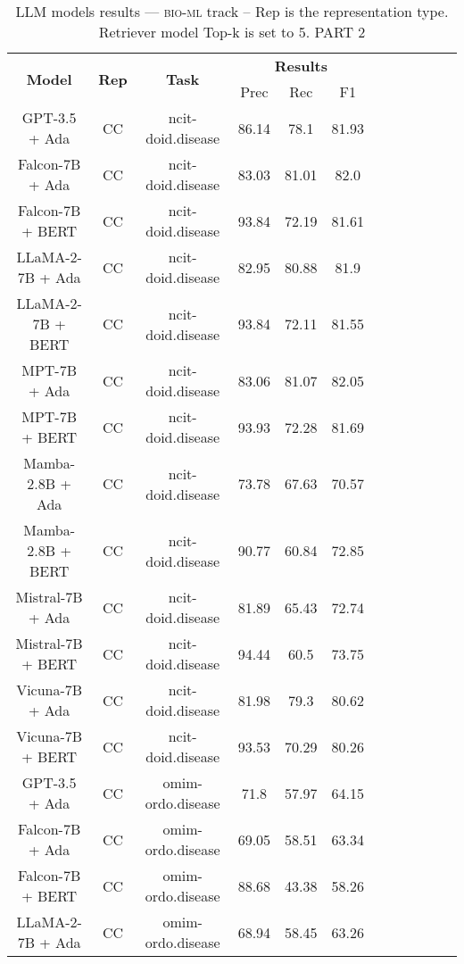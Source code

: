 \begin{table}
        \centering
        \small
        \caption{LLM models results --- \textsc{bio-ml} track -- Rep is the representation type. Retriever model Top-k is set to 5. PART 2 } \label{tab:llm_bio-ml2}
        \begin{tabular}{|c|c|c|c|c|c|c|c|c|c|c|c|}
            \hline
             \multirow{2}{*}{\textbf{Model}}  & \multirow{2}{*}{\textbf{Rep}}  & \multirow{2}{*}{\textbf{Task}} &  \multicolumn{3}{c|}{\textbf{Results}} \\
             \cline{4-6}
              & & & Prec & Rec & F1  \\
            \hline
	GPT-3.5 + Ada  & CC & ncit-doid.disease  &  86.14 &  78.1 & 81.93  \\
	Falcon-7B + Ada  & CC & ncit-doid.disease  &  83.03 &  81.01 & 82.0  \\
	Falcon-7B + BERT  & CC & ncit-doid.disease  &  93.84 &  72.19 & 81.61  \\
	LLaMA-2-7B + Ada  & CC & ncit-doid.disease  &  82.95 &  80.88 & 81.9  \\
	LLaMA-2-7B + BERT  & CC & ncit-doid.disease  &  93.84 &  72.11 & 81.55  \\
	MPT-7B + Ada  & CC & ncit-doid.disease  &  83.06 &  81.07 & 82.05  \\
	MPT-7B + BERT  & CC & ncit-doid.disease  &  93.93 &  72.28 & 81.69  \\
	Mamba-2.8B + Ada  & CC & ncit-doid.disease  &  73.78 &  67.63 & 70.57  \\
	Mamba-2.8B + BERT  & CC & ncit-doid.disease  &  90.77 &  60.84 & 72.85  \\
	Mistral-7B + Ada  & CC & ncit-doid.disease  &  81.89 &  65.43 & 72.74  \\
	Mistral-7B + BERT  & CC & ncit-doid.disease  &  94.44 &  60.5 & 73.75  \\
	Vicuna-7B + Ada  & CC & ncit-doid.disease  &  81.98 &  79.3 & 80.62  \\
	Vicuna-7B + BERT  & CC & ncit-doid.disease  &  93.53 &  70.29 & 80.26  \\
	\hline
	GPT-3.5 + Ada  & CC & omim-ordo.disease  &  71.8 &  57.97 & 64.15  \\
	Falcon-7B + Ada  & CC & omim-ordo.disease  &  69.05 &  58.51 & 63.34  \\
	Falcon-7B + BERT  & CC & omim-ordo.disease  &  88.68 &  43.38 & 58.26  \\
	LLaMA-2-7B + Ada  & CC & omim-ordo.disease  &  68.94 &  58.45 & 63.26  \\

\end{tabular}
\end{table}
